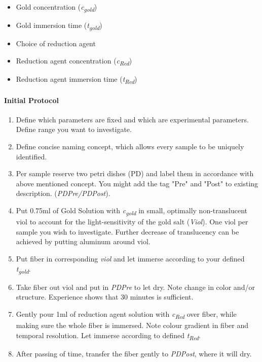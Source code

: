 \begin{multicols}{2}
\begin{itemize}
    \item Gold concentration (\textit{c\textsubscript{gold}})
    \item Gold immersion time (\textit{t\textsubscript{gold}})
    \item Choice of reduction agent
    \item Reduction agent concentration (\textit{c\textsubscript{Red}})
    \item Reduction agent immersion time (\textit{t\textsubscript{Red}})
\end{itemize}
\end{multicols}




\paragraph{Initial Protocol}

\begin{enumerate}
    \item Define which parameters are fixed and which are experimental parameters. Define range you want to investigate.
    
    \item Define concise naming concept, which allows every sample to be uniquely identified.
    
    \item Per sample reserve two petri dishes (PD) and label them in accordance with above mentioned concept. You might add the tag "Pre" and "Post" to existing description. (\textit{PDPre/PDPost}).
    
    \item Put 0.75ml of Gold Solution with \textit{c\textsubscript{gold}} in small, optimally non-translucent viol to account for the light-sensitivity of the gold salt (\textit{Viol}). One viol per sample you wish to investigate. Further decrease of translucency can be achieved by putting aluminum around viol.
    
    \item Put fiber in corresponding \textit{viol} and let immerse according to your defined \textit{t\textsubscript{gold}}.
    \item Take fiber out viol and put in \textit{PDPre} to let dry. Note change in color and/or structure. Experience shows that 30 minutes is sufficient.
    
    \item Gently pour 1ml of reduction agent solution with \textit{c\textsubscript{Red}} over fiber, while making sure the whole fiber is immersed. Note colour gradient in fiber and temporal resolution. Let immerse according to defined \textit{t\textsubscript{Red}}.
    
    \item After passing of time, transfer the fiber gently to \textit{PDPost}, where it will dry.
    \end{enumerate}
    
